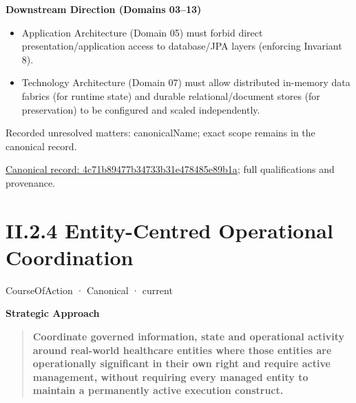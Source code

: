 \par\medskip\textbf{Downstream Direction (Domains 03–13)}\par


\begin{itemize}


\item Application Architecture (Domain 05) must forbid direct presentation/application access to database/JPA layers (enforcing Invariant 8).

\item Technology Architecture (Domain 07) must allow distributed in-memory data fabrics (for runtime state) and durable relational/document stores (for preservation) to be configured and scaled independently.

\end{itemize}

{\small Recorded unresolved matters: canonicalName; exact scope remains in the canonical record.}\par
{\footnotesize \href{../../../../../../../continuum/strategy/course-of-action/4c71b89477b34733b31e478485e89b1a.md}{Canonical record: 4c71b89477b34733b31e478485e89b1a}; full qualifications and provenance.}\par
\section*{II.2.4 Entity-Centred Operational Coordination}
\label{navigation:II.2.4}

\label{element:f601fe1f39a3447f8e9fb2cc4ffe9dee}
{\small CourseOfAction · Canonical · current}\par

\par\medskip\textbf{Strategic Approach}\par


\begin{quote}


\textbf{Coordinate governed information, state and operational activity around real-world healthcare entities where those entities are operationally significant in their own right and require active management, without requiring every managed entity to maintain a permanently active execution construct.}



\end{quote}


